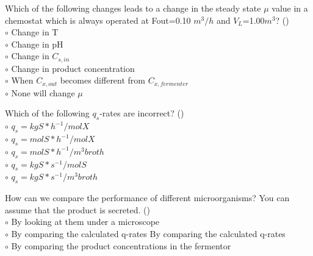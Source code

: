 \documentclass[]{beamer}
\begin{document}
\begin{frame}[shrink] {}
\addtocounter{questions}{1}
\color{blue}
Which of the following changes leads to a change in the steady state $\mu$ value in a chemostat which is always operated at Fout=0.10 $m^{3}/h$ and $V_L$=1.00$m^3$? ()\\
\color{black}
\setlength{\parindent}{-0.4cm}
{\color{red}$\circ$} Change in T\\
{\color{red}$\circ$} Change in pH\\
{\color{red}$\circ$} Change in $C_{s,in}$ \\
{\color{red}$\circ$} Change in product concentration\\
{\color{red}$\circ$} When $C_{x,out}$ becomes different from $C_{x,fermenter}$ \\
{\color{red}$\circ$} None will change $\mu$\\
\end{frame}

\begin{frame}[shrink] {}
\addtocounter{questions}{1}
\color{blue}
Which of the following $q_s$-rates are incorrect? ()\\
\color{black}
\setlength{\parindent}{-0.4cm}
{\color{red}$\circ$} $q_s = kgS*h^{-1}/molX$ \\ 
{\color{red}$\circ$} $q_s = molS*h^{-1}/molX$ \\ 
{\color{red}$\circ$} $q_s = molS*h^{-1}/m^{3}broth$ \\ 
{\color{red}$\circ$} $q_s = kgS*s^{-1}/molS$ \\ 
{\color{red}$\circ$} $q_s = kgS*s^{-1}/m^{3}broth$ \\ 
\end{frame}

\begin{frame}[shrink] {}
\addtocounter{questions}{1}
\color{blue}
How can we compare the performance of different microorganisms? You can assume that the product is secreted. ()\\
\color{black}
\setlength{\parindent}{-0.4cm}
{\color{red}$\circ$}  By looking at them under a microscope\\
{\color{red}$\circ$} By comparing the calculated q-rates By comparing the calculated q-rates \\
{\color{red}$\circ$} By comparing the product concentrations in the fermentor \\
\end{frame}
\end{document}
